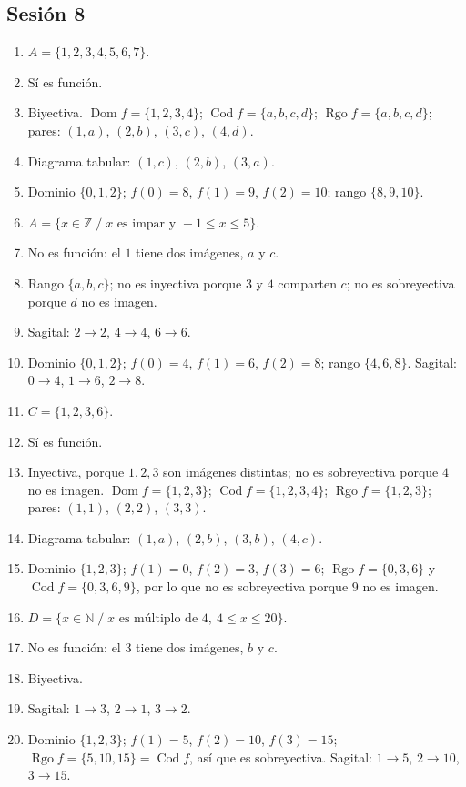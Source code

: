 \documentclass[12pt, letterpaper]{article}
\newcommand{\N}{\mathbb{N}}
\newcommand{\Z}{\mathbb{Z}}
\begin{document}
\subsection*{Sesión 8}
\begin{enumerate}[leftmargin=*, label=\textbf{\arabic*.}]
  \item $A=\{1,2,3,4,5,6,7\}$.
  \item Sí es función.
  \item Biyectiva. $\operatorname{Dom} f=\{1,2,3,4\}$; $\operatorname{Cod} f=\{a,b,c,d\}$; $\operatorname{Rgo} f=\{a,b,c,d\}$; pares: $(1,a)$, $(2,b)$, $(3,c)$, $(4,d)$.
  \item Diagrama tabular: $(1,c)$, $(2,b)$, $(3,a)$.
  \item Dominio $\{0,1,2\}$; $f(0)=8$, $f(1)=9$, $f(2)=10$; rango $\{8,9,10\}$.
  \item $A=\{x\in\Z \;/\; x \text{ es impar y } -1\le x\le 5\}$.
  \item No es función: el $1$ tiene dos imágenes, $a$ y $c$.
  \item Rango $\{a,b,c\}$; no es inyectiva porque $3$ y $4$ comparten $c$; no es sobreyectiva porque $d$ no es imagen.
  \item Sagital: $2\to2$, $4\to4$, $6\to6$.
  \item Dominio $\{0,1,2\}$; $f(0)=4$, $f(1)=6$, $f(2)=8$; rango $\{4,6,8\}$. Sagital: $0\to4$, $1\to6$, $2\to8$.
  \item $C=\{1,2,3,6\}$.
  \item Sí es función.
  \item Inyectiva, porque $1,2,3$ son imágenes distintas; no es sobreyectiva porque $4$ no es imagen. $\operatorname{Dom} f=\{1,2,3\}$; $\operatorname{Cod} f=\{1,2,3,4\}$; $\operatorname{Rgo} f=\{1,2,3\}$; pares: $(1,1)$, $(2,2)$, $(3,3)$.
  \item Diagrama tabular: $(1,a)$, $(2,b)$, $(3,b)$, $(4,c)$.
  \item Dominio $\{1,2,3\}$; $f(1)=0$, $f(2)=3$, $f(3)=6$; $\operatorname{Rgo} f=\{0,3,6\}$ y $\operatorname{Cod} f=\{0,3,6,9\}$, por lo que no es sobreyectiva porque $9$ no es imagen.
  \item $D=\{x\in\N \;/\; x \text{ es múltiplo de } 4,\ 4\le x\le 20\}$.
  \item No es función: el $3$ tiene dos imágenes, $b$ y $c$.
  \item Biyectiva.
  \item Sagital: $1\to3$, $2\to1$, $3\to2$.
  \item Dominio $\{1,2,3\}$; $f(1)=5$, $f(2)=10$, $f(3)=15$; $\operatorname{Rgo} f=\{5,10,15\}=\operatorname{Cod} f$, así que es sobreyectiva. Sagital: $1\to5$, $2\to10$, $3\to15$.
\end{enumerate}
\end{document}
